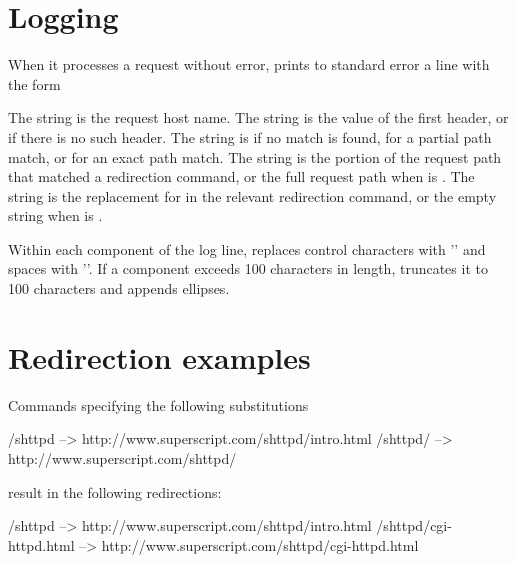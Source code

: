 \section{Logging}

When it processes a request without error,  prints to
standard error a line with the form
\begin{code}
\end{code}
The string  is the request host name.
The string  is the value of the first  header,
  or  if there is no such header.
The string  is  if no match is found,
   for a partial path match,
  or  for an exact path match.
The string  is the portion of the request path that matched a
  redirection command,
  or the full request path when  is .
The string  is the replacement for  in the relevant
  redirection command,
  or the empty string when  is .

Within each component of the log line,  replaces control
characters with '' and spaces with '\cmd{_}'.  If a component exceeds 100
characters in length,  truncates it to 100 characters and
appends ellipses.

\section{Redirection examples}
Commands specifying the following substitutions
\begin{code}
  /shttpd  --> http://www.superscript.com/shttpd/intro.html
  /shttpd/ --> http://www.superscript.com/shttpd/
\end{code}
result in the following redirections:
\begin{code}
  /shttpd --> http://www.superscript.com/shttpd/intro.html
  /shttpd/cgi-httpd.html --> http://www.superscript.com/shttpd/cgi-httpd.html
\end{code}


